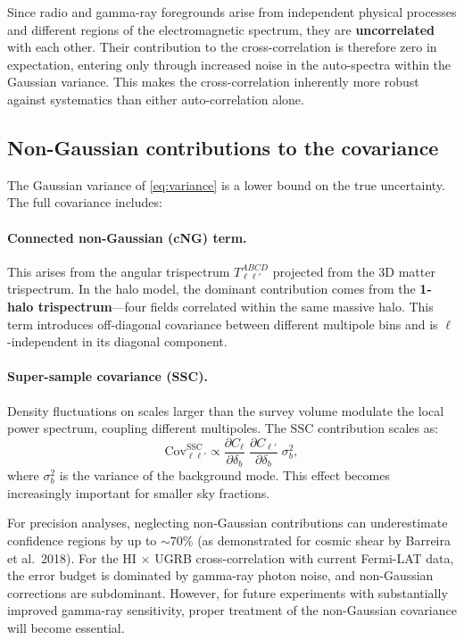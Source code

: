 \documentclass[10pt,a4paper]{article}
\newcommand{\Cl}{C_\ell}
\begin{document}
Since radio and gamma-ray foregrounds arise from independent physical processes and different regions of the electromagnetic spectrum, they are \textbf{uncorrelated} with each other. Their contribution to the cross-correlation is therefore zero in expectation, entering only through increased noise in the auto-spectra within the Gaussian variance. This makes the cross-correlation inherently more robust against systematics than either auto-correlation alone.

\subsection{Non-Gaussian contributions to the covariance}

The Gaussian variance of \cref{eq:variance} is a lower bound on the true uncertainty. The full covariance includes:

\paragraph{Connected non-Gaussian (cNG) term.} This arises from the angular trispectrum $T_{\ell\ell'}^{ABCD}$ projected from the 3D matter trispectrum. In the halo model, the dominant contribution comes from the \textbf{1-halo trispectrum}---four fields correlated within the same massive halo. This term introduces off-diagonal covariance between different multipole bins and is $\ell$-independent in its diagonal component.

\paragraph{Super-sample covariance (SSC).} Density fluctuations on scales larger than the survey volume modulate the local power spectrum, coupling different multipoles. The SSC contribution scales as:
\begin{equation}
\mathrm{Cov}_{\ell\ell'}^{\mathrm{SSC}} \propto \frac{\partial \Cl}{\partial \delta_b} \; \frac{\partial C_{\ell'}}{\partial \delta_b} \; \sigma_b^2,
\end{equation}
where $\sigma_b^2$ is the variance of the background mode. This effect becomes increasingly important for smaller sky fractions.

For precision analyses, neglecting non-Gaussian contributions can underestimate confidence regions by up to $\sim 70\%$ (as demonstrated for cosmic shear by Barreira et al.\ 2018). For the HI $\times$ UGRB cross-correlation with current Fermi-LAT data, the error budget is dominated by gamma-ray photon noise, and non-Gaussian corrections are subdominant. However, for future experiments with substantially improved gamma-ray sensitivity, proper treatment of the non-Gaussian covariance will become essential.
\end{document}
